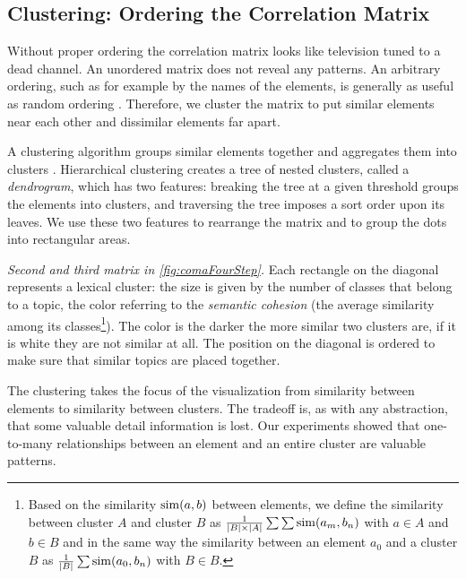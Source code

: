 \subsection{Clustering: Ordering the Correlation Matrix}\label{sec:clustering}


Without proper ordering the correlation matrix looks like television tuned to a dead channel. An unordered matrix does not reveal any patterns. An arbitrary ordering, such as for example by the names of the elements, is generally as useful as random ordering \cite{Bert73a}. Therefore, we cluster the matrix to put similar elements near each other and dissimilar elements far apart.

A clustering algorithm groups similar elements together and aggregates them into clusters \cite{Jain99a}. Hierarchical clustering creates a tree of nested clusters, called a \emph{dendrogram}, which has two features: breaking the tree at a given threshold groups the elements into clusters, and traversing the tree imposes a sort order upon its leaves. We use these two features to rearrange the matrix and to group the dots into rectangular areas.

\emph{Second and third matrix in \autoref{fig:comaFourStep}.} Each rectangle on the diagonal represents a lexical cluster: the size is given by the number of classes that belong to a topic, the color referring to the \emph{semantic cohesion} \cite{Marc05a} (\ie the average similarity among its classes\footnote{Based on the similarity ${\rm sim}(a,b)$ between elements, we define the similarity between cluster $A$ and cluster $B$ as $\frac{1}{|B| \times |A|}\sum \sum {\rm sim}(a_m,b_n)$ with $a \in A$ and $b \in B$ and in the same way the similarity between an element $a_0$ and a cluster $B$ as $\frac{1}{|B|}\sum {\rm sim}(a_0,b_n)$ with $B \in B$.
}). The color is the darker the more similar two clusters are, if it is white they are not similar at all. The position on the diagonal is ordered to make sure that similar topics are placed together.

The clustering takes the focus of the visualization from similarity between elements to similarity between clusters. The tradeoff is, as with any abstraction, that some valuable detail information is lost. Our experiments showed that one-to-many relationships between an element and an entire cluster are valuable patterns.

